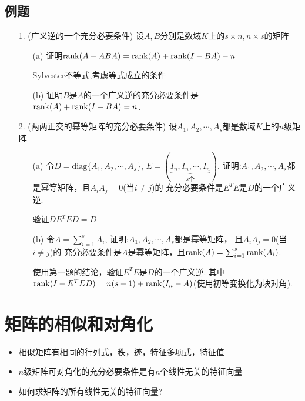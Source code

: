 \subsection*{例题}
\begin{itemize}
	\item[1.] (广义逆的一个充分必要条件)
	设$A,B$分别是数域$K$上的$s\times n, n\times s$的矩阵
	\begin{itemize}
		\item [(a)] 证明$\mathrm{rank}(A-ABA) = \mathrm{rank}(A) + \mathrm{rank}(I-BA) - n$ 
		\begin{solution}
			Sylvester不等式,考虑等式成立的条件
		\end{solution}
		\vspace{2cm}
		\item [(b)] 证明$B$是$A$的一个广义逆的充分必要条件是$\mathrm{rank}(A) + \mathrm{rank}(I-BA) = n$.
		\vspace{1.5cm}
	\end{itemize}
	\item[2.] (两两正交的幂等矩阵的充分必要条件)
	设$A_1, A_2, \cdots, A_s$都是数域$K$上的$n$级矩阵
	\begin{itemize}
		\item [(a)]令$D = \mathrm{diag}\{A_1,A_2,\cdots, A_s\}$,
		$E = (\underbrace{I_n, I_n, \cdots, I_n}_{s\text{个}})$. 证明:$A_1, A_2, \cdots, A_s$都是幂等矩阵，且$A_iA_j=0$(当$i \ne j$)的
		充分必要条件是$E^T E$是$D$的一个广义逆.
		\begin{solution}
			验证$DE^TED=D$
		\end{solution}
		\vspace{1.5cm}
		\item [(b)]令$A=\sum_{i=1}^s A_i$, 证明:$A_1, A_2, \cdots, A_s$都是幂等矩阵，
		且$A_iA_j=0$(当$i \ne j$)的
		充分必要条件是$A$是幂等矩阵，且$\mathrm{rank}(A) = \sum_{i=1}^s \mathrm{rank}(A_i)$.
		\begin{solution}
		使用第一题的结论，验证$E^T E$是$D$的一个广义逆. 其中$\mathrm{rank}(I-E^TED) = n(s-1)+\mathrm{rank}(I_n-A)$(使用初等变换化为块对角).
		\end{solution}
		\vspace{2cm}
	\end{itemize}
\end{itemize}

\section{矩阵的相似和对角化}
\begin{itemize}
\item 相似矩阵有相同的行列式，秩，迹，特征多项式，特征值
\item $n$级矩阵可对角化的充分必要条件是有$n$个线性无关的特征向量
\item 如何求矩阵的所有线性无关的特征向量?
\end{itemize}

